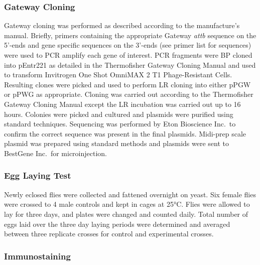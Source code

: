 \documentclass[12pt,oneside]{reedthesis}
\begin{document}
\hypertarget{gateway-cloning}{%
\subsubsection{Gateway Cloning}\label{gateway-cloning}}

Gateway cloning was performed as described according to the manufacture's manual. Briefly, primers containing the appropriate Gateway \emph{attb} sequence on the 5'-ends and gene specific sequences on the 3'-ends (see primer list for sequences) were used to PCR amplify each gene of interest. PCR fragments were BP cloned into pEntr221 as detailed in the Thermofisher Gateway Cloning Manual and used to transform Invitrogen One Shot OmniMAX 2 T1 Phage-Resistant Cells. Resulting clones were picked and used to perform LR cloning into either pPGW or pPWG as appropriate. Cloning was carried out according to the Thermofisher Gateway Cloning Manual except the LR incubation was carried out up to 16 hours. Colonies were picked and cultured and plasmids were purified using standard techniques. Sequencing was performed by Eton Bioscience Inc.~to confirm the correct sequence was present in the final plasmids. Midi-prep scale plasmid was prepared using standard methods and plasmids were sent to BestGene Inc.~for microinjection.

\hypertarget{egg-laying-test}{%
\subsubsection{Egg Laying Test}\label{egg-laying-test}}

Newly eclosed flies were collected and fattened overnight on yeast. Six female flies were crossed to 4 male controls and kept in cages at 25°C. Flies were allowed to lay for three days, and plates were changed and counted daily. Total number of eggs laid over the three day laying periods were determined and averaged between three replicate crosses for control and experimental crosses.

\hypertarget{immunostaining}{%
\subsubsection{Immunostaining}\label{immunostaining}}
\end{document}
